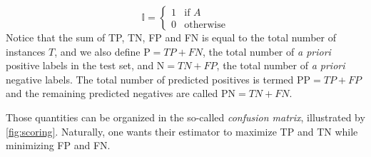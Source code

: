 %
\begin{equation} %
    \mathbb{I} = \begin{cases}
        1 & \text{if } A\\
        0 & \text{otherwise}
    \end{cases}
    \label{eq:indicator}
\end{equation}
%
Notice that the sum of TP, TN, FP and FN is equal to the total number of instances $T$, and we also define $\text{P}=TP+FN$, the total number of \textit{a priori} positive labels in the test set, and $\text{N}=TN+FP$, the total number of \textit{a priori} negative labels. The total number of predicted positives is termed $\text{PP}=TP+FP$ and the remaining predicted negatives are called $\text{PN}=TN+FN$.%


Those quantities can be organized in the so-called \emph{confusion matrix}, illustrated by \autoref{fig:scoring}.
%
Naturally, one wants their estimator to maximize TP and TN while minimizing FP and FN.

